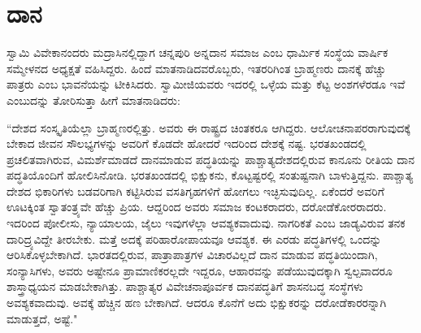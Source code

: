 
\chapter{ದಾನ}

ಸ್ವಾಮಿ ವಿವೇಕಾನಂದರು ಮದ್ರಾಸಿನಲ್ಲಿದ್ದಾಗ ಚನ್ನಪುರಿ ಅನ್ನದಾನ ಸಮಾಜ ಎಂಬ ಧಾರ್ಮಿಕ ಸಂಸ್ಥೆಯ ವಾರ್ಷಿಕ ಸಮ್ಮೇಳನದ ಅಧ್ಯಕ್ಷತೆ ವಹಿಸಿದ್ದರು. ಹಿಂದೆ ಮಾತನಾಡಿದವರೊಬ್ಬರು, ಇತರರಿಗಿಂತ ಬ್ರಾಹ್ಮಣರು ದಾನಕ್ಕೆ ಹೆಚ್ಚು ಪಾತ್ರರು ಎಂಬ ಭಾವನೆಯನ್ನು ಟೀಕಿಸಿದರು. ಸ್ವಾಮೀಜಿಯವರು ಇದರಲ್ಲಿ ಒಳ್ಳೆಯ ಮತ್ತು ಕೆಟ್ಟ ಅಂಶಗಳೆರಡೂ ಇವೆ ಎಂಬುದನ್ನು ತೋರಿಸುತ್ತಾ ಹೀಗೆ ಮಾತನಾಡಿದರು:

“ದೇಶದ ಸಂಸ್ಕೃತಿಯೆಲ್ಲಾ ಬ್ರಾಹ್ಮಣರಲ್ಲಿತ್ತು. ಅವರು ಈ ರಾಷ್ಟ್ರದ ಚಿಂತಕರೂ ಆಗಿದ್ದರು. ಆಲೋಚನಾಪರರಾಗುವುದಕ್ಕೆ ಬೇಕಾದ ಜೀವನ ಸೌಲಭ್ಯಗಳನ್ನು ಅವರಿಗೆ ಕೊಡದೇ ಹೋದರೆ ಇದರಿಂದ ದೇಶಕ್ಕೆ ನಷ್ಟ. ಭರತಖಂಡದಲ್ಲಿ ಪ್ರಚಲಿತವಾಗಿರುವ, ವಿಮರ್ಶೆಮಾಡದೆ ದಾನಮಾಡುವ ಪದ್ಧತಿಯನ್ನು ಪಾಶ್ಚಾತ್ಯದೇಶದಲ್ಲಿರುವ ಕಾನೂನು ರೀತಿಯ ದಾನ ಪದ್ಧತಿಯೊಂದಿಗೆ ಹೋಲಿಸಿನೋಡಿ. ಭರತಖಂಡದಲ್ಲಿ ಭಿಕ್ಷುಕನು, ಕೊಟ್ಟಷ್ಟರಲ್ಲಿ ಸಂತುಷ್ಟನಾಗಿ ಬಾಳುತ್ತಿದ್ದನು. ಪಾಶ್ಚಾತ್ಯ ದೇಶದ ಭಿಕಾರಿಗಳು ಬಡವರಿಗಾಗಿ ಕಟ್ಟಿಸಿರುವ ವಸತಿಗೃಹಗಳಿಗೆ ಹೋಗಲು ಇಚ್ಛಿಸುವುದಿಲ್ಲ. ಏಕೆಂದರೆ ಅವರಿಗೆ ಊಟಕ್ಕಿಂತ ಸ್ವಾತಂತ್ರ್ಯವೇ ಹೆಚ್ಚು ಪ್ರಿಯ. ಆದ್ದರಿಂದ ಅವರು ಸಮಾಜ ಕಂಟಕರಾದರು, ದರೋಡೆಕೋರರಾದರು. ಇದರಿಂದ ಪೋಲೀಸು, ನ್ಯಾಯಾಲಯ, ಜೈಲು ಇವುಗಳೆಲ್ಲಾ ಆವಶ್ಯಕವಾದುವು. ನಾಗರಿಕತೆ ಎಂಬ ಜಾಡ್ಯವಿರುವ ತನಕ ದಾರಿದ್ರ್ಯವಿದ್ದೇ ತೀರಬೇಕು. ಮತ್ತೆ ಅದಕ್ಕೆ ಪರಿಹಾರೋಪಾಯವೂ ಆವಶ್ಯಕ. ಈ ಎರಡು ಪದ್ಧತಿಗಳಲ್ಲಿ ಒಂದನ್ನು ಆರಿಸಿಕೊಳ್ಳಬೇಕಾಗಿದೆ. ಭಾರತದಲ್ಲಿರುವ, ಪಾತ್ರಾಪಾತ್ರಗಳ ವಿಚಾರವಿಲ್ಲದೆ ದಾನ ಮಾಡುವ ಪದ್ಧತಿಯಿಂದಾಗಿ, ಸಂನ್ಯಾಸಿಗಳು, ಅವರು ಅಷ್ಟೇನೂ ಪ್ರಾಮಾಣಿಕರಲ್ಲದೇ ಇದ್ದರೂ, ಆಹಾರವನ್ನು ಪಡೆಯುವುದಕ್ಕಾಗಿ ಸ್ವಲ್ಪವಾದರೂ ಶಾಸ್ತ್ರಾಧ್ಯಯನ ಮಾಡಬೇಕಾಗಿತ್ತು. ಪಾಶ್ಚಾತ್ಯರ ವಿವೇಚನಾಪೂರ್ವಕ ದಾನಪದ್ಧತಿಗೆ ಶಾಸನಬದ್ಧ ಸಂಸ್ಥೆಗಳು ಅವಶ್ಯಕವಾದುವು. ಅವಕ್ಕೆ ಹೆಚ್ಚಿನ ಹಣ ಬೇಕಾಗಿದೆ. ಆದರೂ ಕೊನೆಗೆ ಅದು ಭಿಕ್ಷುಕರನ್ನು ದರೋಡೆಕಾರರನ್ನಾಗಿ ಮಾಡುತ್ತದೆ, ಅಷ್ಟೆ."

